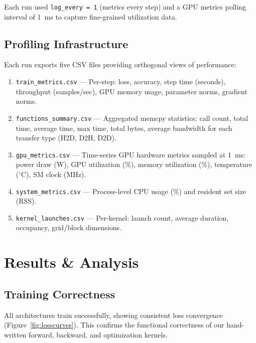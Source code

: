 \documentclass[10pt,twocolumn,letterpaper]{article}
\begin{document}
Each run used \texttt{log\_every = 1} (metrics every step) and a GPU metrics polling interval of 1~ms to capture fine-grained utilization data.

\subsection{Profiling Infrastructure}

Each run exports five CSV files providing orthogonal views of performance:

\begin{enumerate}[nosep,leftmargin=*]
  \item \texttt{train\_metrics.csv} --- Per-step: loss, accuracy, step time (seconds), throughput (samples/sec), GPU memory usage, parameter norms, gradient norms.
  \item \texttt{functions\_summary.csv} --- Aggregated memcpy statistics: call count, total time, average time, max time, total bytes, average bandwidth for each transfer type (H2D, D2H, D2D).
  \item \texttt{gpu\_metrics.csv} --- Time-series GPU hardware metrics sampled at 1~ms: power draw (W), GPU utilization (\%), memory utilization (\%), temperature ($^\circ$C), SM clock (MHz).
  \item \texttt{system\_metrics.csv} --- Process-level CPU usage (\%) and resident set size (RSS).
  \item \texttt{kernel\_launches.csv} --- Per-kernel: launch count, average duration, occupancy, grid/block dimensions.
\end{enumerate}


\section{Results \& Analysis}
\label{sec:results}

\subsection{Training Correctness}
All architectures train successfully, showing consistent loss convergence (Figure~\ref{fig:losscurves}). This confirms the functional correctness of our hand-written forward, backward, and optimization kernels.
\end{document}
